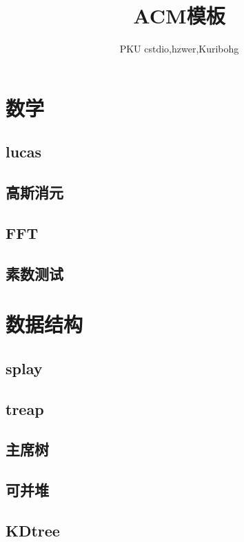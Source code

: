 \documentclass[UTF8,a4paper]{ctexart}
\author{PKU cstdio,hzwer,Kuribohg}
\title{\Huge ACM模板}
\begin{document}
 
\maketitle
\tableofcontents
\section{数学}



\subsection{lucas}

\subsection{高斯消元}





\subsection{FFT}

\subsection{素数测试}

\section{数据结构}

\subsection{splay}

\subsection{treap}

\subsection{主席树}

\subsection{可并堆}

\subsection{KDtree}
\end{document}
